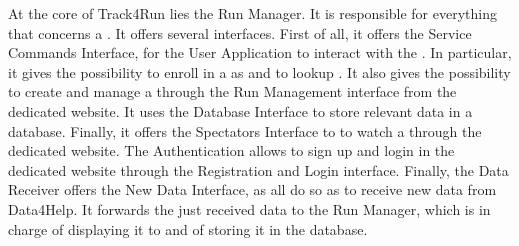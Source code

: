 \documentclass[../../DD.tex]{subfiles}
\begin{document}
	At the core of Track4Run lies the Run Manager. It is responsible for everything that concerns a . It offers several interfaces. First of all, it offers the Service Commands Interface, for the User Application to interact with the . In particular, it gives  the possibility to enroll in a  as  and to lookup . It also gives  the possibility to create and manage a  through the Run Management interface from the  dedicated website. It uses the Database Interface to store relevant data in a database. Finally, it offers the Spectators Interface to  to watch a  through the  dedicated website.
	The Authentication allows  to sign up and login in the dedicated website through the Registration and Login interface.
	Finally, the Data Receiver offers the New Data Interface, as all  do so as to receive new data from Data4Help. It forwards the just received data to the Run Manager, which is in charge of displaying it to  and of storing it in the database.



	
\end{document}
